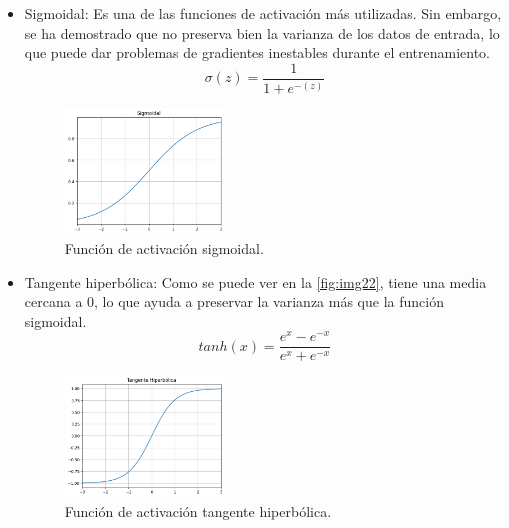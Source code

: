 \begin{itemize}
    \item Sigmoidal: Es una de las funciones de activación más utilizadas. Sin embargo, se ha demostrado que no preserva bien la varianza de los datos de entrada, lo que puede dar problemas de gradientes inestables durante el entrenamiento.
    \begin{equation}
        \sigma (z) = \frac{1}{1+e^{-(z)}}
    \end{equation}
    \begin{figure}[htbp]
        \centering
        \includegraphics[width=0.4\textwidth]{img/img21.png}
        \caption{Función de activación sigmoidal.}
        \label{fig:img21}
    \end{figure}
    
    \item Tangente hiperbólica: Como se puede ver en la \autoref{fig:img22}, tiene una media cercana a $0$, lo que ayuda a preservar la varianza más que la función sigmoidal.
    \begin{equation}
        tanh(x) = \frac{e^{x}-e^{-x}}{e^{x}+e^{-x}}
    \end{equation}
    \begin{figure}[htbp]
        \centering
        \includegraphics[width=0.4\textwidth]{img/img22.png}
        \caption{Función de activación tangente hiperbólica.}
        \label{fig:img22}
    \end{figure}
    

\end{itemize}
